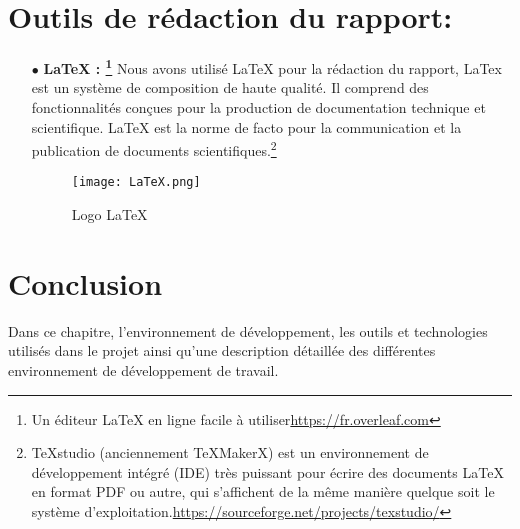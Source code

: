 \section{Outils de rédaction du rapport:}
\begin{itemize}

	\item[$\bullet$] \textbf{ LaTeX : \footnote{ Un éditeur LaTeX en ligne facile à utiliser\url{https://fr.overleaf.com} }} 
Nous avons utilisé LaTeX pour la rédaction du rapport, LaTex est un système de composition
de haute qualité. Il comprend des fonctionnalités conçues pour la production de documentation
technique et scientifique. LaTeX est la norme de facto pour la communication et la publication de
documents scientifiques.\footnote{ TeXstudio (anciennement TeXMakerX) est un environnement de développement intégré (IDE) très puissant pour écrire des documents LaTeX en format PDF ou autre, qui s’affichent de la même manière quelque soit le système d’exploitation.\url{https://sourceforge.net/projects/texstudio/} }\cite{wiki:PHP}
\begin{figure}[ht]
	\centering
	\texttt{[image: LaTeX.png]}
	\caption{Logo LaTeX}
	\label{fig:LaTeX }
\end{figure}
\FloatBarrier
\medskip
\end{itemize}


\section{Conclusion}
Dans ce chapitre, l’environnement de développement, les outils et technologies utilisés dans le projet ainsi qu'une description détaillée des différentes environnement de développement de travail.


